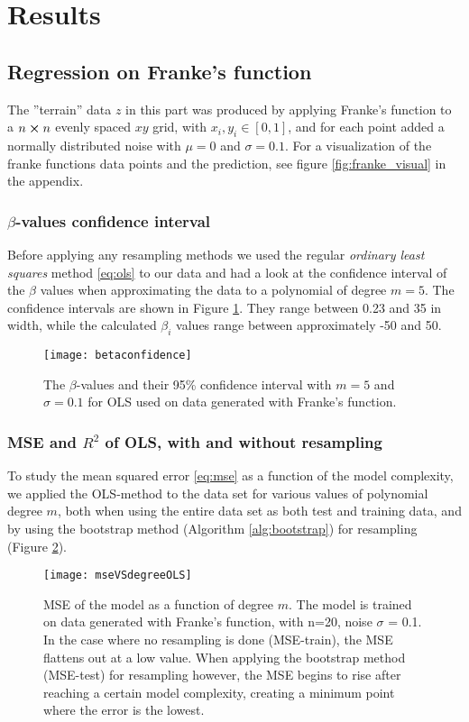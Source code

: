 \section{Results}
\label{sec:results}
\subsection{Regression on Franke's function}
The {''}terrain'' data $z$ in this part was produced by applying Franke's function to a $n\cross n$ evenly spaced $xy$ grid, with $x_i,y_i\in [0,1]$, and for each point added a normally distributed noise with $\mu = 0$ and $\sigma = 0.1$. For a visualization of the franke functions data points and the prediction, see figure \ref{fig:franke_visual} in the appendix.

\subsubsection{$\beta$-values confidence interval}
Before applying any resampling methods we used the regular \emph{ordinary least squares} method \eqref{eq:ols} to our data and had a look at the confidence interval of the $\beta$ values when approximating the data to a polynomial of degree $m=5$. The confidence intervals are shown in Figure \ref{fig:betaconfidence}.
They range between 0.23 and 35 in width, while the calculated $\beta_i$ values range between approximately -50 and 50.
\begin{figure}[htbp]
	\centering
	\texttt{[image: betaconfidence]}
	\caption{The $\beta$-values and their 95\% confidence interval with $m=5$ and $\sigma=0.1$ for OLS used on data generated with Franke's function.}
	\label{fig:betaconfidence}
\end{figure}

\subsubsection{MSE and $R^2$ of OLS, with and without resampling}
To study the mean squared error \eqref{eq:mse} as a function of the model complexity, we applied the OLS-method to the data set for various values of polynomial degree $m$, both when using the entire data set as both test and training data, and by using the bootstrap method (Algorithm \ref{alg:bootstrap}) for resampling (Figure \ref{fig:mseVSdegreeOLS}).

\begin{figure}[htbp]
	\centering
	\texttt{[image: mseVSdegreeOLS]}
	\caption{MSE of the model as a function of degree $m$. The model is trained on data generated with Franke's function, with n=20, noise $\sigma$ = 0.1. In the case where no resampling is done (MSE-train), the MSE flattens out at a low value. When applying the bootstrap method (MSE-test) for resampling however, the MSE begins to rise after reaching a certain model complexity, creating a minimum point where the error is the lowest.}
	\label{fig:mseVSdegreeOLS}
\end{figure}

